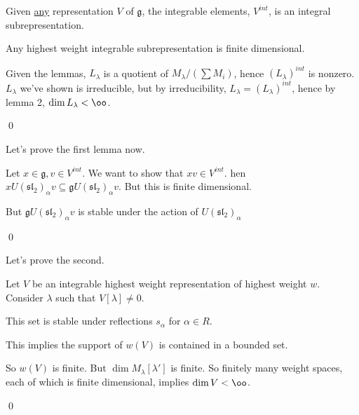 \documentclass[x11names,reqno,14pt]{extarticle}
\newcommand{\mk}[1]{\mathfrak{#1}}
\newcommand{\g}{\mk{g}}
\renewcommand{\sl}{\mk{s}\mk{l}}
\begin{document}
\lem

Given \underline{any} representation $V$ of $\g$, the integrable elements, $V^{int}$, is an integral subrepresentation. 

\lem

Any highest weight integrable subrepresentation is finite dimensional. 

\proof

Given the lemmas, $L_\lambda$ is a quotient of $M_\lambda / (\sum M_i)$, hence $(L_\lambda)^{int}$ is nonzero. $L_\lambda$ we've shown is irreducible, but by irreducibility, $L_\lambda = (L_\lambda)^{int}$, hence by lemma 2, $\dim L_\lambda<\oo$. 

\qed

Let's prove the first lemma now.

\proof

Let $x \in \g, v \in V^{int}$. We want to show that $xv \in V^{int}$. hen $xU(\sl_2)_\alpha v \subseteq \g U(\sl_2)_\alpha v$. But this is finite dimensional. 

But $\g U(\sl_2)_\alpha v$ is stable under the action of $U(\sl_2)_\alpha$

\qed

Let's prove the second. 

\proof

Let $V$ be an integrable highest weight representation of highest weight $w$. Consider $\lambda$ such that $V[\lambda]\neq0$. 

This set is stable under reflections $s_\alpha$ for $\alpha \in R$. 

This implies the support of $w(V)$ is contained in a bounded set.

So $w(V)$ is finite. But $\dim M_\lambda[\lambda']$ is finite. So finitely many weight spaces, each of which is finite dimensional, implies $\dim V < \oo$. 

\qed
\end{document}
